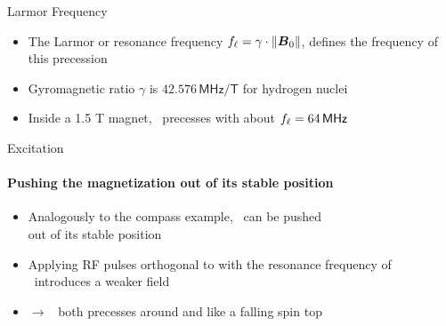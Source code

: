 \begin{frame}{Larmor Frequency}

    \begin{itemize}
        \item The Larmor or resonance frequency $f_\ell = \gamma \cdot \Vert \boldsymbol{B}_{0} \Vert$, defines the frequency of this precession
        \item Gyromagnetic ratio $\gamma$ is $42.576\,\mathsf{MHz/T}$ for hydrogen nuclei
        \item Inside a 1.5 T magnet, \magn~precesses with about $f_\ell = 64\,\mathsf{MHz}$
    \end{itemize}
\end{frame}

\begin{frame}{Excitation}
    \framesubtitle{Pushing the magnetization out of its stable position}

    \begin{itemize}
        \item Analogously to the compass example, \magn~can be pushed \\out of its stable position
        \item Applying RF pulses orthogonal to  with the resonance frequency of \magn~introduces a weaker field 
        \item $\rightarrow$ \magn~both precesses around  and  like a falling spin top
    \end{itemize}
\end{frame}

